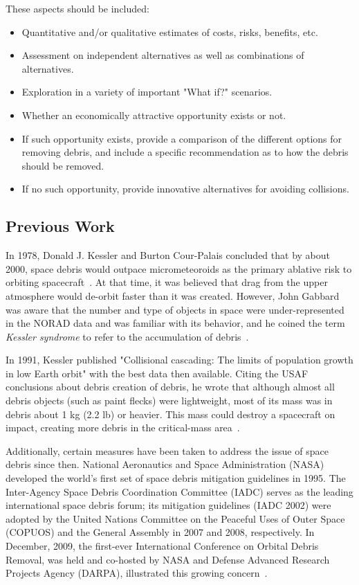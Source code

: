 \documentclass{mcmthesis}
\begin{document}
	These aspects should be included:
	\begin{itemize}
		\item Quantitative and/or qualitative estimates of costs, risks, benefits, etc.
		\item Assessment on independent alternatives as well as combinations of alternatives.
		\item Exploration in a variety of important "What if?" scenarios.
		\item Whether an economically attractive opportunity exists or not.
		\item If such opportunity exists, provide a comparison of the different options for removing debris, and include a specific recommendation as to how the debris should be removed.
		\item If no such opportunity, provide innovative alternatives for avoiding collisions.
	\end{itemize}
	
\subsection{Previous Work}
	
	In 1978,  Donald J. Kessler and Burton Cour-Palais concluded that by about 2000, space debris would outpace micrometeoroids as the primary ablative risk to orbiting spacecraft~\cite{Kessler}. At that time, it was believed that drag from the upper atmosphere would de-orbit faster than it was created. However, John Gabbard was aware that the number and type of objects in space were under-represented in the NORAD data and was familiar with its behavior, and he coined the term \emph{Kessler syndrome} to refer to the accumulation of debris~\cite{Wiki_debris}.
	
	In 1991, Kessler published "Collisional cascading: The limits of population growth in low Earth orbit" with the best data then available. Citing the USAF conclusions about debris creation of debris, he wrote that although almost all debris objects (such as paint flecks) were lightweight, most of its mass was in debris about 1 kg (2.2 lb) or heavier. This mass could destroy a spacecraft on impact, creating more debris in the critical-mass area~\cite{Wiki_debris}.
	
	Additionally, certain measures have been taken to address the issue of space debris since then. National Aeronautics and Space Administration (NASA) developed the world's first set of space debris mitigation guidelines in 1995. The Inter-Agency Space Debris Coordination Committee (IADC) serves as the leading international space debris forum; its mitigation guidelines (IADC 2002) were adopted by the United Nations Committee on the Peaceful Uses of Outer Space (COPUOS) and the General Assembly in 2007 and 2008, respectively. In December, 2009, the first-ever International Conference on Orbital Debris Removal, was held and co-hosted by NASA and Defense Advanced Research Projects Agency (DARPA), illustrated this growing concern~\cite{Megan}.
	
\end{document}
